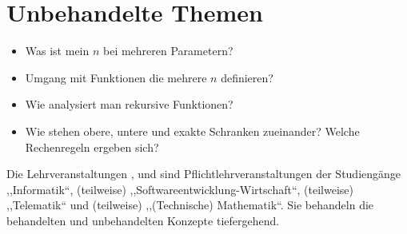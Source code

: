 \section{Unbehandelte Themen}
%
\begin{itemize}
  \item Was ist mein $n$ bei mehreren Parametern?
  \item Umgang mit Funktionen die mehrere $n$ definieren?
  \item Wie analysiert man rekursive Funktionen?
  \item Wie stehen obere, untere und exakte Schranken zueinander? Welche Rechenregeln ergeben sich?
\end{itemize}
%
Die Lehrveranstaltungen \coursedaa{}, \coursetcs{} und \coursedaa{} sind Pflichtlehrveranstaltungen der Studiengänge ,,Informatik``, (teilweise) ,,Softwareentwicklung-Wirtschaft``, (teilweise) ,,Telematik`` und (teilweise) ,,(Technische) Mathematik``. Sie behandeln die behandelten und unbehandelten Konzepte tiefergehend.
